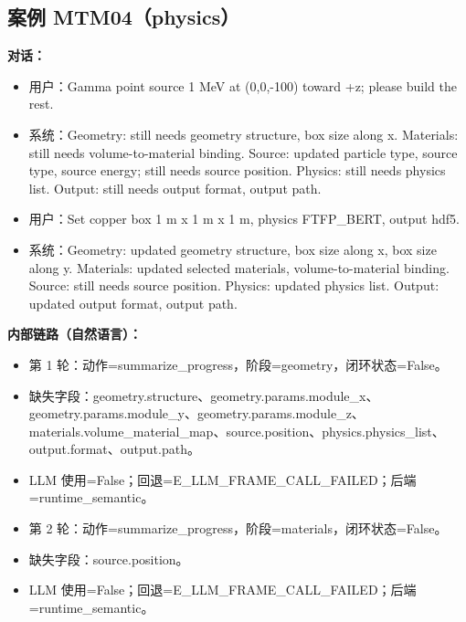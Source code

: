 \documentclass[11pt]{ctexart}
\begin{document}
\subsection{案例 MTM04（physics）}
\textbf{对话：}
\begin{itemize}
\item 用户：Gamma point source 1 MeV at (0,0,-100) toward +z; please build the rest.
\item 系统：Geometry: still needs geometry structure, box size along x. Materials: still needs volume-to-material binding. Source: updated particle type, source type, source energy; still needs source position. Physics: still needs physics list. Output: still needs output format, output path.
\item 用户：Set copper box 1 m x 1 m x 1 m, physics FTFP\_BERT, output hdf5.
\item 系统：Geometry: updated geometry structure, box size along x, box size along y. Materials: updated selected materials, volume-to-material binding. Source: still needs source position. Physics: updated physics list. Output: updated output format, output path.
\end{itemize}
\textbf{内部链路（自然语言）：}
\begin{itemize}
\item 第 1 轮：动作=summarize\_progress，阶段=geometry，闭环状态=False。
\item 缺失字段：geometry.structure、geometry.params.module\_x、geometry.params.module\_y、geometry.params.module\_z、materials.volume\_material\_map、source.position、physics.physics\_list、output.format、output.path。
\item LLM 使用=False；回退=E\_LLM\_FRAME\_CALL\_FAILED；后端=runtime\_semantic。
\item 第 2 轮：动作=summarize\_progress，阶段=materials，闭环状态=False。
\item 缺失字段：source.position。
\item LLM 使用=False；回退=E\_LLM\_FRAME\_CALL\_FAILED；后端=runtime\_semantic。
\end{itemize}
\end{document}
